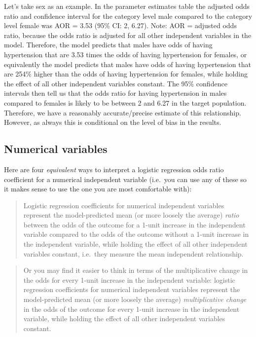 \documentclass[
]{book}
\begin{document}
Let's take sex as an example. In the parameter estimates table the adjusted odds ratio and confidence interval for the category level male compared to the category level female was AOR = 3.53 (95\% CI: 2, 6.27). Note: AOR = adjusted odds ratio, because the odds ratio is adjusted for all other independent variables in the model. Therefore, the model predicts that males have odds of having hypertension that are 3.53 times the odds of having hypertension for females, or equivalently the model predicts that males have odds of having hypertension that are 254\% higher than the odds of having hypertension for females, while holding the effect of all other independent variables constant. The 95\% confidence intervals then tell us that the odds ratio for having hypertension in males compared to females is likely to be between 2 and 6.27 in the target population. Therefore, we have a reasonably accurate/precise estimate of this relationship. However, as always this is conditional on the level of bias in the results.

\hypertarget{numerical-variables-2}{%
\subsection{Numerical variables}\label{numerical-variables-2}}

Here are four \emph{equivalent} ways to interpret a logistic regression odds ratio coefficient for a numerical independent variable (i.e.~you can use any of these so it makes sense to use the one you are most comfortable with):

\begin{quote}
Logistic regression coefficients for numerical independent variables represent the model-predicted mean (or more loosely the average) \emph{ratio} between the odds of the outcome for a 1-unit increase in the independent variable compared to the odds of the outcome without a 1-unit increase in the independent variable, while holding the effect of all other independent variables constant, i.e.~they measure the mean independent relationship.
\end{quote}

\begin{quote}
Or you may find it easier to think in terms of the multiplicative change in the odds for every 1-unit increase in the independent variable: logistic regression coefficients for numerical independent variables represent the model-predicted mean (or more loosely the average) \emph{multiplicative change} in the odds of the outcome for every 1-unit increase in the independent variable, while holding the effect of all other independent variables constant.
\end{quote}
\end{document}
